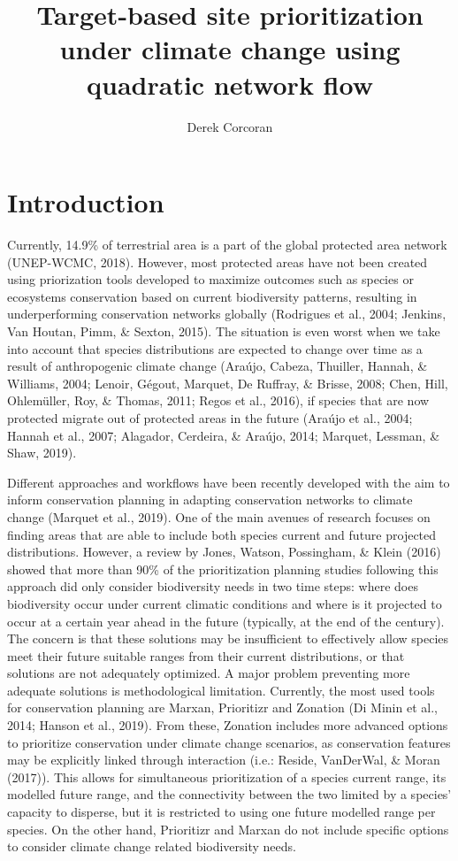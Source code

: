 \documentclass[]{article}
\title{Target-based site prioritization under climate change using quadratic network flow}
\author{Derek Corcoran}
\date{}
\begin{document}
\maketitle

\hypertarget{introduction}{%
\section{Introduction}\label{introduction}}

Currently, 14.9\% of terrestrial area is a part of the global protected area network (UNEP-WCMC, 2018). However, most protected areas have not been created using priorization tools developed to maximize outcomes such as species or ecosystems conservation based on current biodiversity patterns, resulting in underperforming conservation networks globally (Rodrigues et al., 2004; Jenkins, Van Houtan, Pimm, \& Sexton, 2015). The situation is even worst when we take into account that species distributions are expected to change over time as a result of anthropogenic climate change (Araújo, Cabeza, Thuiller, Hannah, \& Williams, 2004; Lenoir, Gégout, Marquet, De Ruffray, \& Brisse, 2008; Chen, Hill, Ohlemüller, Roy, \& Thomas, 2011; Regos et al., 2016), if species that are now protected migrate out of protected areas in the future (Araújo et al., 2004; Hannah et al., 2007; Alagador, Cerdeira, \& Araújo, 2014; Marquet, Lessman, \& Shaw, 2019).

Different approaches and workflows have been recently developed with the aim to inform conservation planning in adapting conservation networks to climate change (Marquet et al., 2019). One of the main avenues of research focuses on finding areas that are able to include both species current and future projected distributions. However, a review by Jones, Watson, Possingham, \& Klein (2016) showed that more than 90\% of the prioritization planning studies following this approach did only consider biodiversity needs in two time steps: where does biodiversity occur under current climatic conditions and where is it projected to occur at a certain year ahead in the future (typically, at the end of the century). The concern is that these solutions may be insufficient to effectively allow species meet their future suitable ranges from their current distributions, or that solutions are not adequately optimized. A major problem preventing more adequate solutions is methodological limitation. Currently, the most used tools for conservation planning are Marxan, Prioritizr and Zonation (Di Minin et al., 2014; Hanson et al., 2019). From these, Zonation includes more advanced options to prioritize conservation under climate change scenarios, as conservation features may be explicitly linked through interaction (i.e.: Reside, VanDerWal, \& Moran (2017)). This allows for simultaneous prioritization of a species current range, its modelled future range, and the connectivity between the two limited by a species' capacity to disperse, but it is restricted to using one future modelled range per species. On the other hand, Prioritizr and Marxan do not include specific options to consider climate change related biodiversity needs.
\end{document}
